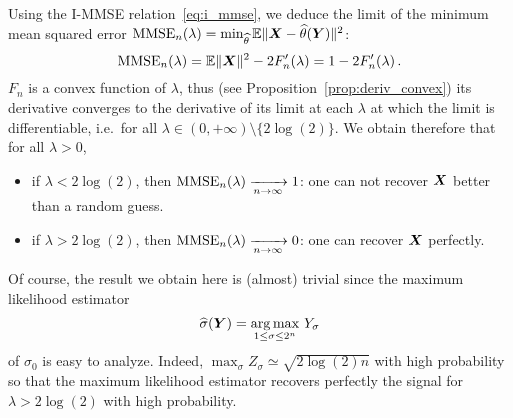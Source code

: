 \documentclass[12pt,nocut]{article}
\begin{document}
Using the I-MMSE relation~\eqref{eq:i_mmse}, we deduce the limit of the minimum mean squared error ${{\rm MMSE}}_n(\lambda) =  \min_{\widehat{\theta}} \mathbb{E} \| {\boldsymbol X} - \widehat{\theta}({\boldsymbol Y}) \|^2$:
$$
{{\rm MMSE}}_n(\lambda) = \mathbb{E} \|{\boldsymbol X}\|^2 - 2 F_n'(\lambda) = 1 - 2 F_n'(\lambda) \,.
$$
$F_n$ is a convex function of $\lambda$, thus (see Proposition~\ref{prop:deriv_convex}) its derivative converges to the derivative of its limit at each $\lambda$ at which the limit is differentiable, i.e.\ for all $\lambda \in (0,+\infty) \setminus \{2 \log(2) \}$. We obtain therefore that for all $\lambda >0$,
\begin{itemize}
	\item if $\lambda < 2 \log(2)$, then ${{\rm MMSE}}_n(\lambda) \xrightarrow[n \to \infty]{} 1$: one can not recover ${\boldsymbol X}$ better than a random guess.
	\item if $\lambda > 2 \log(2)$, then ${{\rm MMSE}}_n(\lambda) \xrightarrow[n \to \infty]{} 0$: one can recover ${\boldsymbol X}$ perfectly.
\end{itemize}
Of course, the result we obtain here is (almost) trivial since the maximum likelihood estimator 
$$
\widehat{\sigma}({\boldsymbol Y}) = \operatorname*{arg\,max}_{1 \leq \sigma \leq 2^n} \, Y_{\sigma}
$$
of $\sigma_0$ is easy to analyze. Indeed, $\max_{\sigma} Z_{\sigma} \simeq \sqrt{2 \log(2)n}$ with high probability so that the maximum likelihood estimator recovers perfectly the signal for $\lambda > 2 \log(2)$ with high probability.
\end{document}
